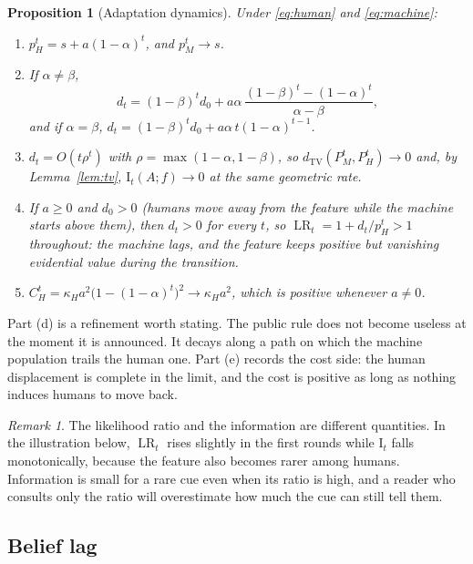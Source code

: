 \documentclass[11pt]{article}
\theoremstyle{plain}
\newtheorem{proposition}{Proposition}
\theoremstyle{definition}
\theoremstyle{remark}
\newtheorem{remark}{Remark}
\newcommand{\TV}{d_{\mathrm{TV}}}
\newcommand{\I}{\mathrm{I}}
\newcommand{\LR}{\operatorname{LR}}
\begin{document}
\begin{proposition}[Adaptation dynamics]\label{prop:dyn}
Under \eqref{eq:human} and \eqref{eq:machine}:
\begin{enumerate}[label=(\alph*),leftmargin=2.2em]
\item $p_H^t=s+a(1-\alpha)^t$, and $p_M^t\to s$.
\item If $\alpha\ne\beta$,
\[
d_t=(1-\beta)^t d_0+a\alpha\,\frac{(1-\beta)^t-(1-\alpha)^t}{\alpha-\beta},
\]
and if $\alpha=\beta$, $d_t=(1-\beta)^t d_0+a\alpha\,t(1-\alpha)^{t-1}$.
\item $d_t=O(t\rho^t)$ with $\rho=\max(1-\alpha,1-\beta)$, so $\TV(P_M^t,P_H^t)\to0$ and, by Lemma~\ref{lem:tv}, $\I_t(A;f)\to0$ at the same geometric rate.
\item If $a\ge0$ and $d_0>0$ (humans move away from the feature while the machine starts above them), then $d_t>0$ for every $t$, so $\LR_t=1+d_t/p_H^t>1$ throughout: the machine lags, and the feature keeps positive but vanishing evidential value during the transition.
\item $C_H^t=\kappa_H a^2\bigl(1-(1-\alpha)^t\bigr)^2\to\kappa_H a^2$, which is positive whenever $a\neq0$.
\end{enumerate}
\end{proposition}

Part (d) is a refinement worth stating. The public rule does not become useless at the moment it is announced. It decays along a path on which the machine population trails the human one. Part (e) records the cost side: the human displacement is complete in the limit, and the cost is positive as long as nothing induces humans to move back.

\begin{remark}
The likelihood ratio and the information are different quantities. In the illustration below, $\LR_t$ rises slightly in the first rounds while $\I_t$ falls monotonically, because the feature also becomes rarer among humans. Information is small for a rare cue even when its ratio is high, and a reader who consults only the ratio will overestimate how much the cue can still tell them.
\end{remark}

\subsection{Belief lag}\label{sec:belief}
\end{document}
